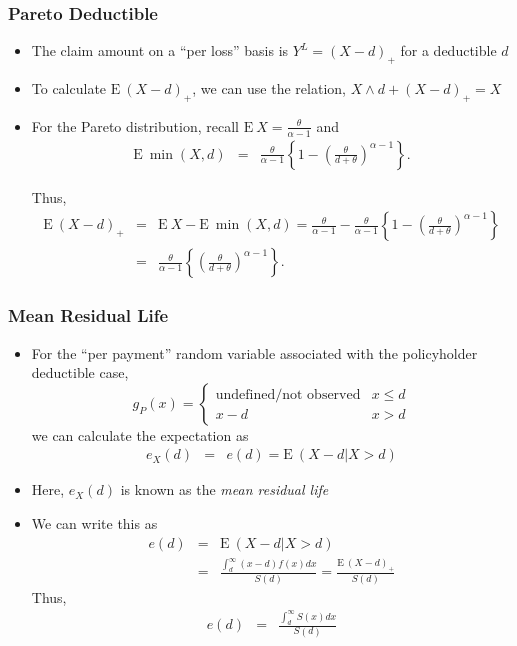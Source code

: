 \documentclass{beamer}
\begin{document}
\begin{frame}[shrink=2]
\frametitle{Pareto Deductible}
\begin{itemize}
\item The claim amount on a ``per loss'' basis is $Y^L = (X-d)_+$ for a deductible
$d$ \vspace{2mm}

\item To calculate $\mathrm{E~} (X-d)_+$, we can use the relation, $X \wedge d + (X - d)_{+} =
X$ \vspace{2mm}

\item For the Pareto distribution, recall $\mathrm{E~}X = \frac{\theta}{\alpha - 1}$ and
\begin{eqnarray*}
\mathrm{E~}\min(X, d)  &=&  \frac{\theta}{\alpha-1}\left\{1 - \left(\frac{\theta}{d + \theta}\right)^{\alpha-1} \right\}.
\end{eqnarray*} \vspace{2mm}

Thus,
\begin{eqnarray*}
\mathrm{E~}(X-d)_+ &=& \mathrm{E~} X -
\mathrm{E~}\min(X, d)  =  \frac{\theta}{\alpha-1} -\frac{\theta}{\alpha-1}\left\{1 - \left(\frac{\theta}{d + \theta}\right)^{\alpha-1} \right\} \\
&=& \frac{\theta}{\alpha-1} \left\{\left(\frac{\theta}{d + \theta}\right)^{\alpha-1} \right\} .
\end{eqnarray*}
\end{itemize}
\end{frame}

\begin{frame}%
\frametitle{Mean Residual Life}
\begin{itemize}
\item For the ``per payment'' random variable associated with the policyholder deductible case,
\begin{equation*}
g_P(x) =
\begin{cases}
\text{undefined/not observed} & x \le d\\
x - d & x > d
\end{cases}
\end{equation*}
we can calculate the expectation as
\begin{eqnarray*}
e_X(d) &=& e(d) = \mathrm{E~}(X - d|X > d)
\end{eqnarray*} %
\item Here, $e_X(d)$ is known as the \textit{mean residual life} %
\item We can write this as
\begin{eqnarray*}
e(d) &=&  \mathrm{E~}(X - d|X > d)\\
&=& \frac{\int_d^{\infty} (x-d) f(x)dx}{S(d)} = \frac{\mathrm{E~}(X - d)_+}{S(d)}
\end{eqnarray*} %
Thus,
\begin{eqnarray*}
e(d) &=& \frac{\int_d^{\infty} S(x)dx}{S(d)}
\end{eqnarray*}
\end{itemize}
\end{frame}
\end{document}
